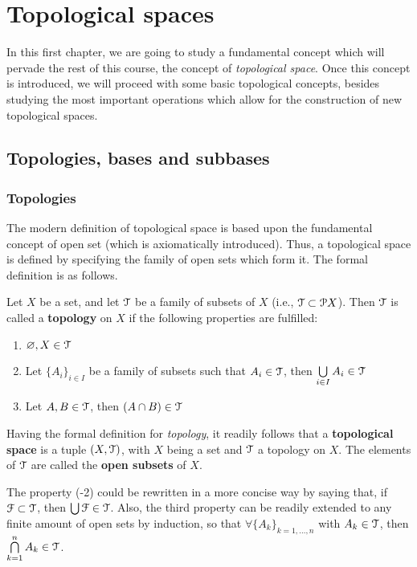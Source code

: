 \chapter{Topological spaces}\label{ch:topological-spaces}

In this first chapter, we are going to study a fundamental concept which will pervade
the rest of this course, the concept of \emph{topological space}.
Once this concept is introduced, we will proceed with some basic topological concepts,
besides studying the most important operations which allow for the construction of new
topological spaces.

\section{Topologies, bases and subbases}
\label{sec:topologies-bases-and-subbases}

\subsection{Topologies}
\label{subsec:topologies}

The modern definition of topological space is based upon the fundamental concept of
open  set (which is axiomatically introduced).
Thus, a topological space is defined by specifying the family of open sets which form it.
The formal definition is as follows.

\begin{definition}
	\label{def:topology}
	Let $X$ be a set, and let $\EuScript{T}$ be a family of subsets of $X$ (i.e., $\EuScript{T}\subset\EuScript{P} X$).
	Then $\EuScript{T}$ is called a \textbf{topology} on $X$ if the following properties are
	fulfilled:
	\begin{enumerate}
		\item $\varnothing, X\in \EuScript{T}$
		\item Let $\{A_i\}_{i\in I}$ be a family of subsets such that $A_i \in \EuScript{T}$,
		then $\bigcup\limits_{i\in I} A_i\in\EuScript{T}$
		\item Let $A, B\in \EuScript{T}$, then $(A\cap B)\in \EuScript{T}$
	\end{enumerate}
\end{definition}

Having the formal definition for \emph{topology}, it readily follows that a
\textbf{topological space} is a tuple $(X, \EuScript{T})$, with $X$ being a set and $\EuScript{T}$ a
topology on $X$.
The elements of $\EuScript{T}$ are called the \textbf{open subsets} of $X$.

\begin{remark}
	The property (-2) could be rewritten in a more concise way by
	saying that, if $\EuScript{F}\subset\EuScript{T}$, then $\bigcup\EuScript{F}\in\EuScript{T}$.
	Also, the third property can be readily extended to any finite amount of open sets
	by induction, so that $\forall \{A_k\}_{k=1,\dots,n}$ with $A_k\in\EuScript{T}$, then
	$\bigcap\limits_{k=1}^n A_k\in \EuScript{T}$.
\end{remark}


